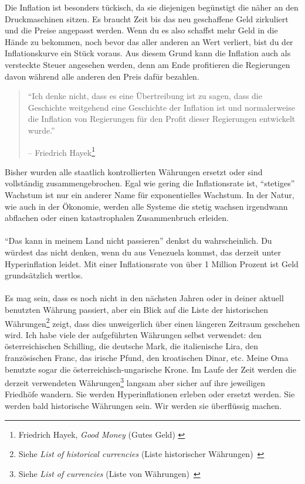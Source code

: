 Die Inflation ist besonders tückisch, da sie diejenigen begünstigt die näher an
den Druckmaschinen sitzen. Es braucht Zeit bis das neu geschaffene Geld
zirkuliert und die Preise angepasst werden. Wenn du es also schaffst mehr Geld
in die Hände zu bekommen, noch bevor das aller anderen an Wert verliert, bist du
der Inflationskurve ein Stück voraus. Aus diesem Grund kann die Inflation auch
als versteckte Steuer angesehen werden, denn am Ende profitieren die Regierungen
davon während alle anderen den Preis dafür bezahlen.

\begin{quotation}\begin{samepage}
\enquote{Ich denke nicht, dass es eine Übertreibung ist zu sagen, dass die
Geschichte weitgehend eine Geschichte der Inflation ist und normalerweise die
Inflation von Regierungen für den Profit dieser Regierungen entwickelt wurde.}
\begin{flushright} -- Friedrich Hayek\footnote{Friedrich Hayek, \textit{Good
Money} (Gutes Geld) \cite{hayek-good-money}}
\end{flushright}\end{samepage}\end{quotation}

Bisher wurden alle staatlich kontrollierten Währungen ersetzt oder sind
vollständig zusammengebrochen. Egal wie gering die Inflationsrate ist,
\enquote{stetiges} Wachstum ist nur ein anderer Name für exponentielles
Wachstum. In der Natur, wie auch in der Ökonomie, werden alle Systeme die stetig
wachsen irgendwann abflachen oder einen katastrophalen Zusammenbruch
erleiden.

\paragraph{}
\enquote{Das kann in meinem Land nicht passieren} denkst du wahrscheinlich. Du
würdest das nicht denken, wenn du aus Venezuela kommst, das derzeit unter
Hyperinflation leidet. Mit einer Inflationsrate von über 1 Million Prozent ist
Geld grundsätzlich wertlos. \cite{wiki:venezuela}

\paragraph{}
Es mag sein, dass es noch nicht in den nächsten Jahren oder in deiner aktuell
benutzten Währung passiert, aber ein Blick auf die Liste der historischen
Währungen\footnote{Siehe \textit{List of historical currencies} (Liste
historischer Währungen)~\cite{wiki:historical-currencies}} zeigt,
dass dies unweigerlich über einen längeren Zeitraum geschehen wird. Ich habe
viele der aufgeführten Währungen selbst verwendet: den österreichischen
Schilling, die deutsche Mark, die italienische Lira, den französischen Franc,
das irische Pfund, den kroatischen Dinar, etc. Meine Oma benutzte sogar die
österreichisch-ungarische Krone. Im Laufe der Zeit werden die derzeit
verwendeten Währungen\footnote{Siehe \textit{List of currencies} (Liste von
Währungen)~\cite{wiki:list-of-currencies}} langsam aber sicher auf
ihre jeweiligen Friedhöfe wandern. Sie werden Hyperinflationen erleben oder
ersetzt werden. Sie werden bald historische Währungen sein. Wir werden sie
überflüssig machen.

